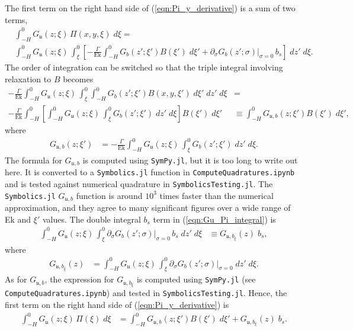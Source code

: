 \documentclass{ametsocV6.2}
\begin{document}
The first term on the right hand side of (\ref{eqn:Pi_y_derivative}) is a sum of two terms,
\begin{align}
& \int_{-H}^{0} G_{ \mathfrak{u}} ( z; \xi) \, \Pi (x,y, \xi) \; d \xi 
= \nonumber \\
& \int_{-H}^{0} G_{ \mathfrak{u}} ( z; \xi) \, \int_{\xi}^{0} \left[ - \frac{\Gamma}{\mathrm{Ek}}  \int_{-H}^{0} G_b(z'; \xi') B(\xi') \; d \xi'  + \partial_\sigma G_b(z';\sigma) |_{\sigma = 0} \, b_s \right] \; dz'  \; d \xi . 
\label{eqn:Gu_Pi_integral}
\end{align}
The order of integration can be switched so that the triple integral involving relaxation to $B$ becomes
\begin{align}
- \frac{\Gamma}{\mathrm{Ek}} \int_{-H}^{0} G_{ \mathfrak{u}} ( z; \xi) \, \int_{\xi}^{0} \int_{-H}^{0} G_b(z'; \xi') B(x,y,\xi') \; d \xi' \; dz'  \; d \xi  &= \nonumber \\
- \frac{\Gamma}{\mathrm{Ek}} \int_{-H}^{0} \left[ \int_{-H}^{0} G_{ \mathfrak{u}} ( z; \xi) \, \int_{\xi}^{0}  G_b(z'; \xi') \; dz'  \; d \xi \right] B(\xi')  \; d \xi' 
& \equiv
\int_{-H}^{0} G_{ \mathfrak{u}, b} ( z; \xi')  B(\xi') \; d \xi' ,
\label{eqn:Guvb_term}
\end{align}
where
\begin{align}
G_{ \mathfrak{u}, b} ( z; \xi') & = 
- \frac{\Gamma}{\mathrm{Ek}} \int_{-H}^{0} G_{ \mathfrak{u}} ( z; \xi) \, \int_{\xi}^{0}  G_b(z'; \xi') \; dz'  \; d \xi .
\label{eqn:Guv_b_def}
\end{align}
The formula for $G_{ \mathfrak{u}, b}$ is computed using \texttt{SymPy.jl}, but it is too long to write out here. 
It is converted to a \texttt{Symbolics.jl} function in \texttt{ComputeQuadratures.ipynb} and is tested against numerical quadrature in \texttt{SymbolicsTesting.jl}.
The \texttt{Symbolics.jl} $G_{ \mathfrak{u}, b}$ function is around $10^3$ times faster than the numerical approximation, and they agree to many significant figures over a wide range of Ek and $\xi'$ values.
The double integral $b_s$ term in (\ref{eqn:Gu_Pi_integral}) is
\begin{align}
\int_{-H}^{0} G_{ \mathfrak{u}} ( z; \xi) \, \int_{\xi}^{0} \partial_\sigma G_b(z';\sigma) |_{\sigma = 0} \, b_s \; dz'  \; d \xi & \equiv
G_{ \mathfrak{u}, {b_\xi}} ( z) \; b_s  ,
\label{eqn:Gu_bs_term}
\end{align}
where
\begin{align}
G_{ \mathfrak{u}, {b_\xi}} ( z)  & = \int_{-H}^{0} G_{ \mathfrak{u}} ( z; \xi) \, \int_{\xi}^{0} \partial_\sigma G_b(z';\sigma) |_{\sigma = 0} \; dz'  \; d \xi .
\label{eqn:Guv_b_xi_def}
\end{align}
As for $G_{ \mathfrak{u}, b}$, the expression for $G_{ \mathfrak{u}, {b_\xi}}$ is computed using \texttt{SymPy.jl} (see \texttt{ComputeQuadratures.ipynb}) and tested in \texttt{SymbolicsTesting.jl}.
Hence, the first term on the right hand side of (\ref{eqn:Pi_y_derivative}) is
\begin{align}
\int_{-H}^{0} G_{ \mathfrak{u}} ( z; \xi) \, \Pi (\xi) \; d \xi 
& = 
\int_{-H}^{0} G_{ \mathfrak{u}, b} ( z; \xi')  B(\xi') \; d \xi'
+ G_{ \mathfrak{u}, {b_\xi}} ( z) \; b_s .
\label{eqn:G_uvb_and_Guvb_xi_term}
\end{align}
\end{document}
